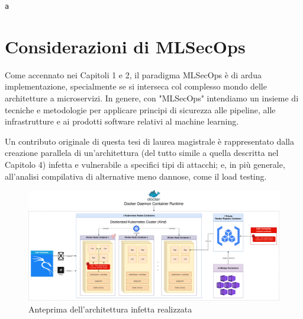 % 
% 
% 

\begin{small}
\begin{Verbatim}[commandchars=\\\{\}]

\end{Verbatim}
\end{small}

{\small \verb|a|}


\clearpage
\cleardoublepage

\chapter{Considerazioni di MLSecOps}

Come accennato nei Capitoli 1 e 2, il paradigma MLSecOps è di ardua implementazione, specialmente se si interseca col complesso mondo delle architetture a microservizi. In genere, con "MLSecOps" intendiamo un insieme di tecniche e metodologie per applicare principi di sicurezza alle pipeline, alle infrastrutture e ai prodotti software relativi al machine learning.

Un contributo originale di questa tesi di laurea magistrale è rappresentato dalla creazione parallela di un'architettura (del tutto simile a quella descritta nel Capitolo 4) infetta e vulnerabile a specifici tipi di attacchi; e, in più generale, all'analisi compilativa di alternative meno dannose, come il load testing.

\begin{figure}[H]
    \centering
    \includegraphics[width=\linewidth]{figures/ch4and5/arch2.png}
    \caption[Anteprima dell'architettura infetta realizzata]{Anteprima dell'architettura infetta realizzata}
    \label{fig:cha6:arch}
\end{figure}

